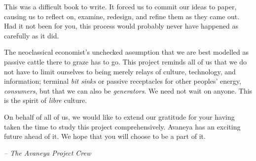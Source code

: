 

This was a difficult book to write. It forced us to commit our ideas to paper, causing us to reflect on, examine, redesign, and refine them as they came out. Had it not been for you, this process would probably never have happened as carefully as it did.

The neoclassical economist's unchecked assumption that we are best modelled as passive cattle there to graze has to go. This project reminds all of us that we do not have to limit ourselves to being merely relays of culture, technology, and information; terminal {\it bit sinks} or passive receptacles for other peoples' energy, {\it consumers}, but that we can also be {\it generators}. We need not wait on anyone. This is the spirit of {\it libre} culture.

On behalf of all of us, we would like to extend our gratitude for your having taken the time to study this project comprehensively. Avaneya has an exciting future ahead of it. We hope that you will choose to be a part of it. 

\hskip 1.5cm {\it -- The Avaneya Project Crew}

\StopChapter

